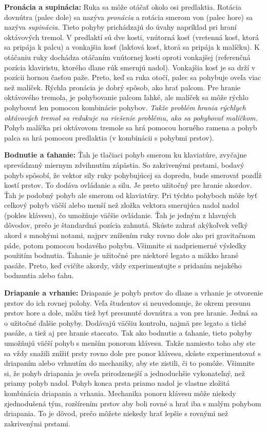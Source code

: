 \textbf{Pronácia a supinácia:} Ruka sa môže otáčať okolo osi predlaktia. Rotácia dovnútra (palec dole) sa nazýva \emph{pronácia} a rotácia smerom von (palec hore) sa nazýva \emph{supinácia.} Tieto pohyby prichádzajú do úvahy napríklad pri hraní oktávových tremol. V predlaktí sú dve kosti, vnútorná kosť (vretenná kosť, ktorá sa pripája k palcu) a vonkajšia kosť (lakťová kosť, ktorá sa pripája k malíčku). K otáčaniu ruky dochádza otáčaním vnútornej kosti oproti vonkajšej (referenčná pozícia klaviristu, ktorého dlane rúk smerujú nadol). Vonkajšia kosť je sa drží v pozícii hornou časťou paže. Preto, keď sa ruka otočí, palec sa pohybuje oveľa viac než malíček. Rýchla pronácia je dobrý spôsob, ako hrať palcom. Pre hranie oktávového tremola, je pohybovanie palcom ľahké, ale malíček sa môže rýchlo pohybovať len pomocou kombinácie pohybov. \emph{Takže problém hrania rýchlych oktávových tremol sa redukuje na riešenie problému, ako sa pohybovať malíčkom.} Pohyb malíčka pri oktávovom tremole sa hrá pomocou horného ramena a pohyb palca sa hrá pomocou predlaktia (v kombinácii s pohybmi prstov). 

\textbf{Bodnutie a ťahanie:} Ťah je tlačiaci pohyb smerom ku klaviatúre, zvyčajne sprevádzaný miernym zdvihnutím zápästia. So zakrivenými prstami, bodavý pohyb spôsobí, že vektor sily ruky pohybujúcej sa dopredu, bude smerovať pozdĺž kostí prstov. To dodáva ovládanie a silu. Je preto užitočný pre hranie akordov. Ťah je podobný pohyb ale smerom od klaviatúry. Pri týchto pohyboch môže byť celkový pohyb väčší alebo menší než zložka vektora smerujúca nadol nadol (pokles klávesu), čo umožňuje väčšie ovládanie. Ťah je jedným z hlavných dôvodov, prečo je štandardná pozícia zahnutá. Skúste zahrať akýkoľvek veľký akord s mnohými notami, najprv znížením ruky rovno dole ako pri gravitačnom páde, potom pomocou bodavého pohybu. Všimnite si nadpriemerné výsledky použitím bodnutia. Ťahanie je užitočné pre niektoré legato a mäkko hrané pasáže. Preto, keď cvičíte akordy, vždy experimentujte s pridaním nejakého bodnuntia alebo ťahu. 

\textbf{Driapanie a vrhanie:} Driapanie je pohyb prstov do dlane a vrhanie je otvorenie prstov do ich rovnej polohy. Veľa študentov si neuvedomuje, že okrem presunu prstov hore a dole, môžu tiež byť presunuté dovnútra a von pre hranie. Jedná sa o užitočné ďalšie pohyby. Dodávajú väčšiu kontrolu, najmä pre legato a tiché pasáže, a tiež aj pre hranie staccato. Tak ako bodnutie a ťahanie, tieto pohyby umožňujú väčší pohyb s menším ponorom klávesu. Takže namiesto toho aby ste sa vždy snažili znížiť prsty rovno dole pre ponor klávesu, skúste experimentovať s driapaním alebo vrhnutím do mechaniky, aby ste zistili, či to pomôže. Všimnite si, že pohyb driapania je oveľa prirodzenejší a jednoduchšie vykonateľný, než priamy pohyb nadol. Pohyb konca prsta priamo nadol je vlastne zložitá kombinácia driapania a vrhania. Mechanika ponoru klávesu môže niekedy zjednodušená tým, rozšírením prstov aby boli rovné a hrať iba s malým pohybom driapania. To je dôvod, prečo môžete niekedy hrať lepšie s rovnými než zakrivenými prstami. 

